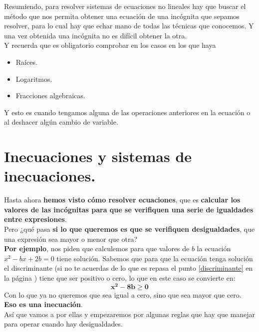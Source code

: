 \documentclass[a4paper,11pt,answers]{exam}
\begin{document}
  Resumiendo, para resolver sistemas de ecuaciones no lineales hay que buscar el método que nos
  permita obtener una ecuación de una incógnita que sepamos resolver, para lo cual hay que
  echar mano de todas las técnicas que conocemos. Y una vez obtenida una incógnita no es difícil
  obtener la otra.\\
  Y recuerda que es obligatorio comprobar en los casos en los que haya
  \begin{itemize}
  \item Raíces.
  \item Logaritmos.
  \item Fracciones algebraicas.
  \end{itemize}
  Y esto es cuando tengamos alguna de las operaciones anteriores en la ecuación o al deshacer algún
  cambio de variable.
  \section{Inecuaciones y sistemas de inecuaciones.}
  Hasta ahora \textbf{hemos visto cómo resolver ecuaciones}, que es \textbf{calcular los valores
    de las incógnitas para que se verifiquen una serie de igualdades entre expresiones}.\\

  Pero ¿qué pasa \textbf{si lo que queremos es que se verifiquen desigualdades}, que una
  expresión sea mayor o menor que otra?\\
  \textbf{Por ejemplo}, nos piden que calculemos para que valores de $b$ la ecuación $x^2 - bx +
  2b = 0$ tiene solución. Sabemos que para que la ecuación tenga solución el discriminante (si no
  te acuerdas de lo que es repasa el punto \ref{discriminante} en la página \pageref{discriminante})
  tiene que ser positivo o cero, lo que en este caso se convierte en:
  \[\boldsymbol{x^2 - 8b \geq 0}\]
  Con lo que ya no queremos que sea igual a cero, sino que sea mayor que cero. \textbf{Eso es
    una inecuación}.\\

  Así que vamos a por ellas y empezaremos por algunas reglas que hay que manejar para operar
  cuando hay desigualdades.
\end{document}
